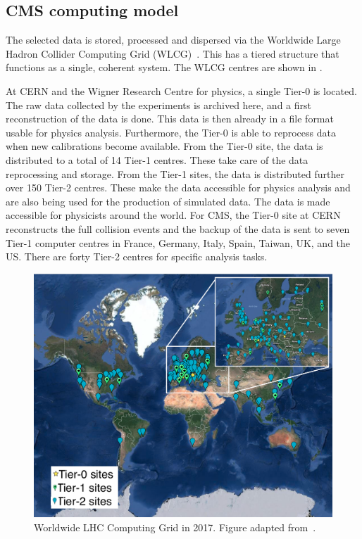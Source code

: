 \subsection{CMS computing model}
\label{sec:Computing}
The selected data is stored, processed and dispersed via the Worldwide Large Hadron Collider Computing Grid (WLCG)~\cite{Grandi:814248,Eck:840543}. This has a tiered structure that functions as a single, coherent system. The WLCG centres are shown in .

At CERN and the Wigner Research Centre for physics, a single Tier-0 is located. The raw data collected by the experiments is archived here, and a first reconstruction of the data is done. This data is then already in a file format usable for physics analysis. Furthermore, the Tier-0 is able to reprocess data when new calibrations become available. From the Tier-0 site, the data is distributed to a total of 14 Tier-1 centres. These take care of the data reprocessing and storage. From the Tier-1 sites, the data is distributed further over 150 Tier-2 centres. These make the data accessible for physics analysis and are also being used for the production of simulated data. The data is made accessible for  physicists around the world. For CMS, the Tier-0 site at CERN reconstructs the full collision events and the backup of the data is sent to seven Tier-1 computer centres in France, Germany, Italy, Spain, Taiwan, UK, and the US.  There are forty Tier-2 centres for specific analysis tasks. 
\begin{figure}[htbp]
	\centering
	\includegraphics[width=1.\linewidth]{2_ExperimentalSetup/Figures/WLHCG}
	\caption{Worldwide LHC Computing Grid in 2017. Figure adapted from~\cite{WLCG}.}
	\label{fig:wlhcg}
\end{figure}
